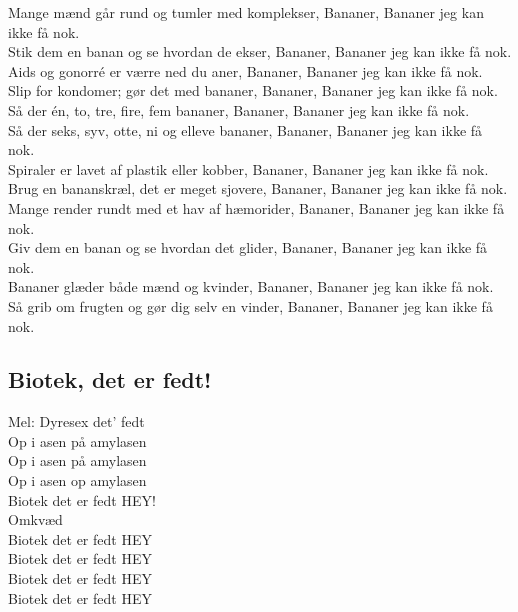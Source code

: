 Mange mænd går rund og tumler med komplekser, Bananer, Bananer jeg kan ikke få nok.\\ 
Stik dem en banan og se hvordan de ekser, Bananer, Bananer jeg kan ikke få nok.\\ 

Aids og gonorré er værre ned du aner, Bananer, Bananer jeg kan ikke få nok.\\ 
Slip for kondomer; gør det med bananer, Bananer, Bananer jeg kan ikke få nok.\\ 

Så der én, to, tre, fire, fem bananer, Bananer, Bananer jeg kan ikke få nok.\\
Så der seks, syv, otte, ni og elleve bananer, Bananer, Bananer jeg kan ikke få nok.\\ 

Spiraler er lavet af plastik eller kobber, Bananer, Bananer jeg kan ikke få nok.\\ 
Brug en bananskræl, det er meget sjovere, Bananer, Bananer jeg kan ikke få nok.\\ 

Mange render rundt med et hav af hæmorider, Bananer, Bananer jeg kan ikke få nok.\\ 
Giv dem en banan og se hvordan det glider, Bananer, Bananer jeg kan ikke få nok.\\ 

Bananer glæder både mænd og kvinder, Bananer, Bananer jeg kan ikke få nok.\\ 
Så grib om frugten og gør dig selv en vinder, Bananer, Bananer jeg kan ikke få nok.\\

\subsection*{Biotek, det er fedt!}

Mel: Dyresex det’ fedt\\

Op i asen på amylasen\\
Op i asen på amylasen\\
Op i asen op amylasen\\
Biotek det er fedt HEY!\\

Omkvæd\\
Biotek det er fedt HEY\\
Biotek det er fedt HEY\\
Biotek det er fedt HEY\\
Biotek det er fedt HEY\\

